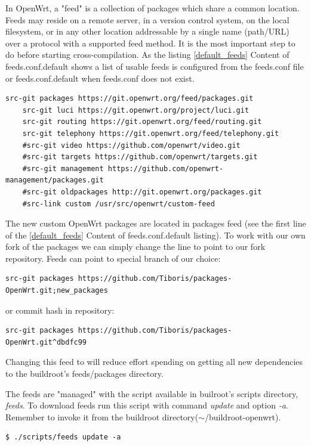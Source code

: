 In OpenWrt, a "feed" is a collection of packages which share a common location.
Feeds may reside on a remote server, in a version control system, on the local filesystem, or in any other location addressable by a single name (path/URL) over a protocol with a supported feed method.
It is the most important step to do before starting cross-compilation.
As the listing \ref{default_feeds} Content of feeds.conf.default shows a list of usable feeds is configured from the feeds.conf file or feeds.conf.default when feeds.conf does not exist.

\begin{lstlisting}[columns=fixed,basicstyle=\ttfamily\footnotesize,tabsize=4,label=default_feeds,caption=Content of feeds.conf.default]
    src-git packages https://git.openwrt.org/feed/packages.git
    src-git luci https://git.openwrt.org/project/luci.git
    src-git routing https://git.openwrt.org/feed/routing.git
    src-git telephony https://git.openwrt.org/feed/telephony.git
    #src-git video https://github.com/openwrt/video.git
    #src-git targets https://github.com/openwrt/targets.git
    #src-git management https://github.com/openwrt-management/packages.git
    #src-git oldpackages http://git.openwrt.org/packages.git
    #src-link custom /usr/src/openwrt/custom-feed
\end{lstlisting}

The new custom OpenWrt packages are located in packages feed (see the first line of the \ref{default_feeds} Content of feeds.conf.default listing).
To work with our own fork of the packages we can simply change the line to point to our fork repository.
Feeds can point to special branch of our choice:
\begin{lstlisting}[columns=fixed,basicstyle=\ttfamily\footnotesize,tabsize=4,backgroundcolor=\color{yellow!10}]
src-git packages https://github.com/Tiboris/packages-OpenWrt.git;new_packages
\end{lstlisting}
or commit hash in repository:
\begin{lstlisting}[columns=fixed,basicstyle=\ttfamily\footnotesize,tabsize=4,backgroundcolor=\color{yellow!10}]
src-git packages https://github.com/Tiboris/packages-OpenWrt.git^dbdfc99
\end{lstlisting}
Changing this feed to will reduce effort spending on getting all new dependencies to the buildroot's feeds/packages directory.

The feeds are "managed" with the script available in builroot's scripts directory, {\it feeds}.
To download feeds run this script with command {\it update} and option {\it -a}.
Remember to invoke it from the buildroot directory($\sim$/buildroot-openwrt).
\begin{lstlisting}[columns=fixed,basicstyle=\ttfamily\footnotesize,tabsize=4,backgroundcolor=\color{yellow!10}]
$ ./scripts/feeds update -a
\end{lstlisting}

